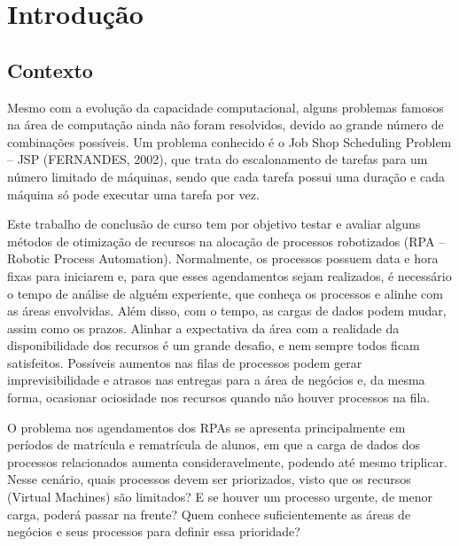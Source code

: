 \documentclass[
    12pt,                %
    openright,           %
    oneside,             %
    a4paper,             %
    english,             %
    brazil               %
]{abntex2}
\begin{document}
\textual

\chapter{Introdução}
\label{cap:introducao}

\section{Contexto}
\label{sec:contexto}

Mesmo com a evolução da capacidade computacional, alguns problemas famosos na área de computação ainda não foram resolvidos, devido ao grande número de combinações possíveis. Um problema conhecido é o Job Shop Scheduling Problem – JSP (FERNANDES, 2002), que trata do escalonamento de tarefas para um número limitado de máquinas, sendo que cada tarefa possui uma duração e cada máquina só pode executar uma tarefa por vez.

Este trabalho de conclusão de curso tem por objetivo testar e avaliar alguns métodos de otimização de recursos na alocação de processos robotizados (RPA – Robotic Process Automation). Normalmente, os processos possuem data e hora fixas para iniciarem e, para que esses agendamentos sejam realizados, é necessário o tempo de análise de alguém experiente, que conheça os processos e alinhe com as áreas envolvidas. Além disso, com o tempo, as cargas de dados podem mudar, assim como os prazos. Alinhar a expectativa da área com a realidade da disponibilidade dos recursos é um grande desafio, e nem sempre todos ficam satisfeitos. Possíveis aumentos nas filas de processos podem gerar imprevisibilidade e atrasos nas entregas para a área de negócios e, da mesma forma, ocasionar ociosidade nos recursos quando não houver processos na fila.

O problema nos agendamentos dos RPAs se apresenta principalmente em períodos de matrícula e rematrícula de alunos, em que a carga de dados dos processos relacionados aumenta consideravelmente, podendo até mesmo triplicar. Nesse cenário, quais processos devem ser priorizados, visto que os recursos (Virtual Machines) são limitados? E se houver um processo urgente, de menor carga, poderá passar na frente? Quem conhece suficientemente as áreas de negócios e seus processos para definir essa prioridade?
\end{document}
